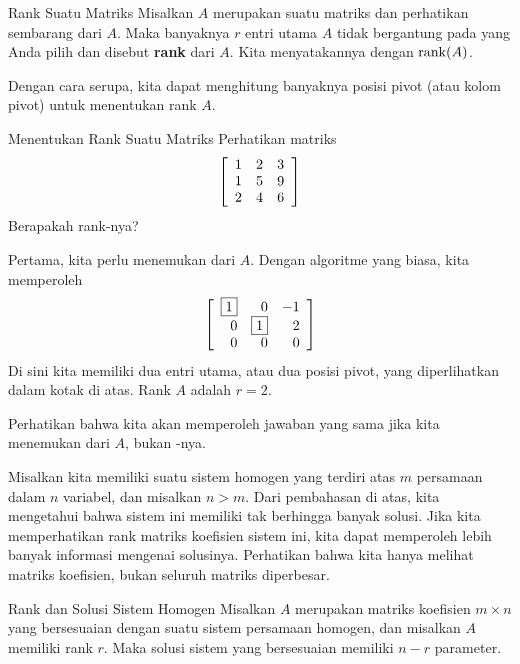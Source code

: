 \begin{definition}{Rank Suatu Matriks}\label{def:rank}
Misalkan $A$ merupakan suatu matriks dan perhatikan sembarang \ef \;dari $A$.
Maka banyaknya $r$ entri utama $A$ tidak bergantung pada \ef \;yang Anda pilih dan disebut \textbf{rank}  dari $A$. Kita menyatakannya dengan $\mbox{rank}(A)$.
\end{definition}

Dengan cara serupa, kita dapat menghitung banyaknya posisi pivot (atau kolom pivot)
untuk menentukan rank $A$.

\begin{example}{Menentukan Rank Suatu Matriks}\label{exa:rankofamatrix}
Perhatikan matriks
\begin{equation*}
\left[
\begin{array}{rrr}
1 & 2 & 3 \\
1 & 5 & 9 \\
2 & 4 & 6 
\end{array}
\right]
\end{equation*}
Berapakah rank-nya?
\end{example}

\begin{solution}
Pertama, kita perlu menemukan \rref \;dari $A$. Dengan algoritme yang biasa, kita memperoleh
\begin{equation*}
\left[
\begin{array}{rrr}
\fbox{1} & 0 & -1 \\
0 & \fbox{1} & 2 \\
0 & 0 & 0
\end{array}
\right]
\end{equation*}
Di sini kita memiliki dua entri utama, atau dua posisi pivot, yang diperlihatkan dalam kotak di atas. Rank $A$ adalah $r = 2.$
\end{solution}

Perhatikan bahwa kita akan memperoleh jawaban yang sama jika kita menemukan \ef \;dari $A$, bukan \rref-nya.

Misalkan kita memiliki suatu sistem homogen yang terdiri atas $m$ persamaan dalam $n$ variabel, dan misalkan
$n > m$. Dari pembahasan di atas, kita mengetahui bahwa sistem ini memiliki tak berhingga banyak solusi. Jika kita memperhatikan rank matriks
 koefisien sistem ini, kita dapat memperoleh lebih banyak informasi mengenai solusinya. Perhatikan bahwa kita hanya melihat matriks koefisien, bukan seluruh
matriks diperbesar.

\begin{theorem}{Rank dan Solusi Sistem Homogen}\label{thm:rankhomogeneoussolutions}
Misalkan $A$ merupakan matriks koefisien $m \times n$ yang bersesuaian dengan suatu sistem persamaan homogen, dan misalkan $A$ memiliki rank $r$.
Maka solusi sistem yang bersesuaian memiliki $n-r$ parameter.
\end{theorem}

